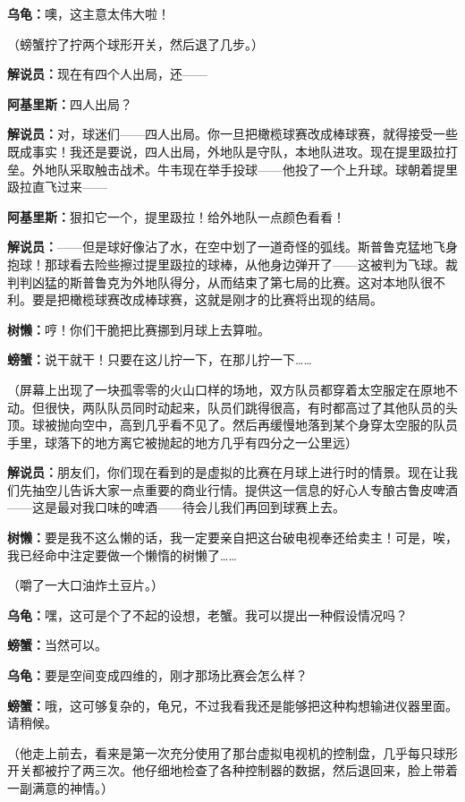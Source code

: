 \documentclass[
  12pt,
  twoside,
  openright,
  oldfontcommands,
]{memoir}
\newcommand{\dialogname}[1]{{\heifamily\bfseries #1}}
\begin{document}
\dialogname{乌龟：}噢，这主意太伟大啦！

（螃蟹拧了拧两个球形开关，然后退了几步。）

\dialogname{解说员：}现在有四个人出局，还------

\dialogname{阿基里斯：}四人出局？

\dialogname{解说员：}对，球迷们------四人出局。你一旦把橄榄球赛改成棒球赛，就得接受一些既成事实！我还是要说，四人出局，外地队是守队，本地队进攻。现在提里趿拉打垒。外地队采取触击战术。牛韦现在举手投球------他投了一个上升球。球朝着提里趿拉直飞过来------

\dialogname{阿基里斯：}狠扣它一个，提里趿拉！给外地队一点颜色看看！

\dialogname{解说员：}------但是球好像沾了水，在空中划了一道奇怪的弧线。斯普鲁克猛地飞身抱球！那球看去险些擦过提里趿拉的球棒，从他身边弹开了------这被判为飞球。裁判判凶猛的斯普鲁克为外地队得分，从而结束了第七局的比赛。这对本地队很不利。要是把橄榄球赛改成棒球赛，这就是刚才的比赛将出现的结局。

\dialogname{树懒：}哼！你们干脆把比赛挪到月球上去算啦。

\dialogname{螃蟹：}说干就干！只要在这儿拧一下，在那儿拧一下\ldots\ldots{}

（屏幕上出现了一块孤零零的火山口样的场地，双方队员都穿着太空服定在原地不动。但很快，两队队员同时动起来，队员们跳得很高，有时都高过了其他队员的头顶。球被抛向空中，高到几乎看不见了。然后再缓慢地落到某个身穿太空服的队员手里，球落下的地方离它被抛起的地方几乎有四分之一公里远）

\dialogname{解说员：}朋友们，你们现在看到的是虚拟的比赛在月球上进行时的情景。现在让我们先抽空儿告诉大家一点重要的商业行情。提供这一信息的好心人专酿古鲁皮啤酒------这是最对我口味的啤酒------待会儿我们再回到球赛上去。

\dialogname{树懒：}要是我不这么懒的话，我一定要亲自把这台破电视奉还给卖主！可是，唉，我已经命中注定要做一个懒惰的树懒了\ldots\ldots{}

（嚼了一大口油炸土豆片。）

\dialogname{乌龟：}嘿，这可是个了不起的设想，老蟹。我可以提出一种假设情况吗？

\dialogname{螃蟹：}当然可以。

\dialogname{乌龟：}要是空间变成四维的，刚才那场比赛会怎么样？

\dialogname{螃蟹：}哦，这可够复杂的，龟兄，不过我看我还是能够把这种构想输进仪器里面。请稍候。

（他走上前去，看来是第一次充分使用了那台虚拟电视机的控制盘，几乎每只球形开关都被拧了两三次。他仔细地检查了各种控制器的数据，然后退回来，脸上带着一副满意的神情。）
\end{document}
